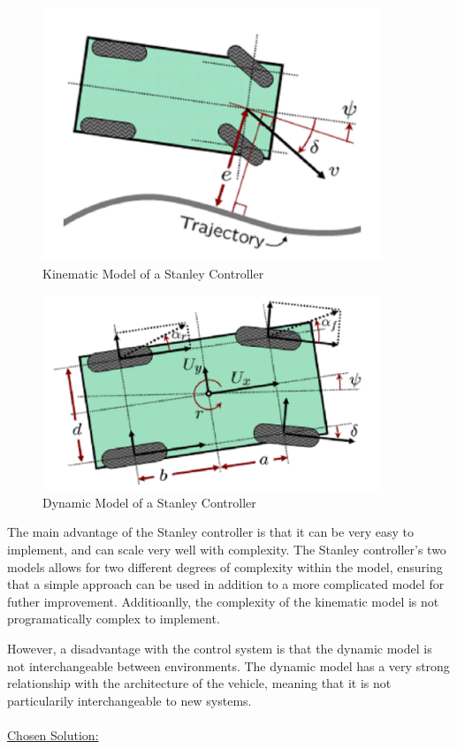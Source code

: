 \documentclass[titlepage]{article}
\begin{document}
{\begin{figure}
	\centering
	\includegraphics[width=4in]{stanley_kinematic}
	\caption{Kinematic Model of a Stanley Controller}
	\label{fig:stankine}
\end{figure}

\begin{figure}
	\centering
	\includegraphics[width=4in]{stanley_dynamic}
	\caption{Dynamic Model of a Stanley Controller}
	\label{fig:standyna}
\end{figure}

The main advantage of the Stanley controller is that it can be very easy to implement, and can scale very well with complexity. The Stanley controller's two models allows for two different degrees of complexity within the model, ensuring that a simple approach can be used in addition to a more complicated model for futher improvement. Additioanlly, the complexity of the kinematic model is not programatically complex to implement.

However, a disadvantage with the control system is that the dynamic model is not interchangeable between environments. The dynamic model has a very strong relationship with the architecture of the vehicle, meaning that it is not particularily interchangeable to new systems. \\~\\
\underline{Chosen Solution:}

}
\end{document}
